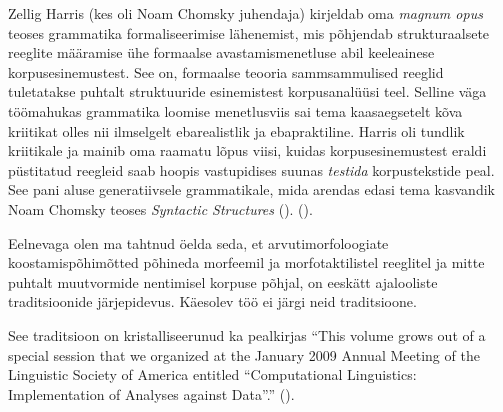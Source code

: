 \documentclass[12pt,a4paper]{article}
\begin{document}
Zellig Harris (kes oli Noam Chomsky juhendaja) kirjeldab oma \textit{magnum opus} teoses grammatika formaliseerimise lähenemist, mis põhjendab strukturaalsete reeglite määramise ühe formaalse avastamis\-menetluse abil keeleainese korpus\-esinemustest. See on, formaalse teooria sammsammulised reeglid tuletatakse puhtalt struktuuride esinemistest korpusanalüüsi teel. Selline väga töömahukas grammatika loomise menetlusviis sai tema kaasaegsetelt kõva kriitikat olles nii ilmselgelt ebarealistlik ja ebapraktiline. Harris oli tundlik kriitikale ja mainib oma raamatu lõpus viisi, kuidas korpus\-esinemustest eraldi püstitatud reegleid saab hoopis vastupidises suunas \textit{testida} korpustekstide peal. See pani aluse generatiivsele grammatikale, mida arendas edasi tema kasvandik Noam Chomsky teoses \textit{Syntactic Structures} (\citeyear{chomsky_syntactic_1957}). (\cite[2031]{auroux_history_2006}).

Eelnevaga olen ma tahtnud öelda seda, et arvutimorfoloogiate koostamis\-põhimõtted põhineda morfeemil ja morfotaktilistel reeglitel ja mitte puhtalt muutvormide nentimisel korpuse põhjal, on eeskätt ajalooliste traditsioonide järjepidevus. Käesolev töö ei järgi neid traditsioone.

See traditsioon on kristalliseerunud ka pealkirjas ``This volume grows out of a special session that we organized at the January 2009 Annual Meeting of the Linguistic Society of America entitled ``Computational Linguistics: Implementation of Analyses against Data''.'' (\cite{bender_computational_2010}).

\end{document}
